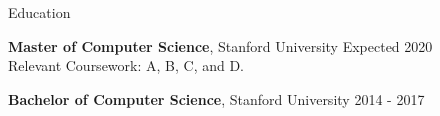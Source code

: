 \begin{rSection}{Education}

    {\bf Master of Computer Science}, Stanford University \hfill {Expected 2020}\\
    Relevant Coursework: A, B, C, and D.
    
    {\bf Bachelor of Computer Science}, Stanford University \hfill {2014 - 2017}
    
    
\end{rSection}
